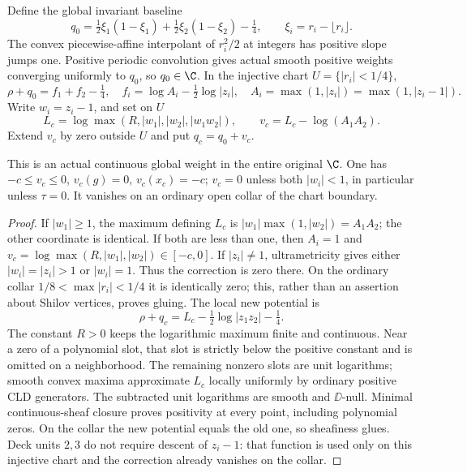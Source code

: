 Define the global invariant baseline
\[
 q_0=\tfrac12\xi_1(1-\xi_1)+\tfrac12\xi_2(1-\xi_2)-\tfrac14,
 \qquad \xi_i=r_i-\lfloor r_i\rfloor.
\]
The convex piecewise-affine interpolant of $r_i^2/2$ at integers has
positive slope jumps one. Positive periodic convolution gives actual
smooth positive weights converging uniformly to $q_0$, so $q_0\in\C$.
In the injective chart $U=\{|r_i|<1/4\}$,
\[
 \rho+q_0=f_1+f_2-\tfrac14,
 \quad f_i=\log A_i-\tfrac12\log|z_i|,
 \quad A_i=\max(1,|z_i|)=\max(1,|z_i-1|).
\]
Write $w_i=z_i-1$, and set on $U$
\[
 L_c=\log\max(R,|w_1|,|w_2|,|w_1w_2|),\qquad
 v_c=L_c-\log(A_1A_2).
\]
Extend $v_c$ by zero outside $U$ and put $q_c=q_0+v_c$.

\begin{lemma}\label{newns:glue}
This is an actual continuous global weight in the entire original $\C$.
One has $-c\le v_c\le0$, $v_c(g)=0$, $v_c(x_c)=-c$;
$v_c=0$ unless both $|w_i|<1$, in particular unless $\tau=0$.
It vanishes on an ordinary open collar of the chart boundary.
\end{lemma}
\begin{proof}
If $|w_1|\ge1$, the maximum defining $L_c$ is
$|w_1|\max(1,|w_2|)=A_1A_2$; the other coordinate is identical.
If both are less than one, then $A_i=1$ and
$v_c=\log\max(R,|w_1|,|w_2|)\in[-c,0]$.
If $|z_i|\ne1$, ultrametricity gives either $|w_i|=|z_i|>1$
or $|w_i|=1$. Thus the correction is zero there.
On the ordinary collar $1/8<\max|r_i|<1/4$ it is identically zero;
this, rather than an assertion about Shilov vertices, proves gluing.
The local new potential is
\[
 \rho+q_c=L_c-\tfrac12\log|z_1z_2|-\tfrac14.
\]
The constant $R>0$ keeps the logarithmic maximum finite and continuous.
Near a zero of a polynomial slot, that slot is strictly below the
positive constant and is omitted on a neighborhood. The remaining
nonzero slots are unit logarithms; smooth convex maxima approximate
$L_c$ locally uniformly by ordinary positive CLD generators.
The subtracted unit logarithms are smooth and $\DD$-null. Minimal
continuous-sheaf closure proves positivity at every point, including
polynomial zeros. On the collar the new potential equals the old one,
so sheafiness glues. Deck units $2,3$ do not require descent of $z_i-1$:
that function is used only on this injective chart and the correction
already vanishes on the collar.
\end{proof}

